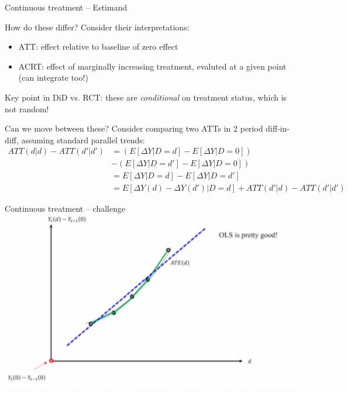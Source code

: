 \documentclass[notes,11pt, aspectratio=169]{beamer}
\newenvironment{wideitemize}{\itemize\addtolength{\itemsep}{10pt}}{\enditemize}
\begin{document}
\begin{frame}{Continuous treatment -- Estimand}
  \begin{wideitemize}
  \item How do these differ? Consider their interpretations:
    \begin{itemize}
    \item ATT: effect relative to baseline of zero effect
    \item ACRT: effect of marginally increasing treatment, evaluted at a given point (can integrate too!)
    \end{itemize}
  \item Key point in DiD vs. RCT: these are \emph{conditional} on treatment status, which is not random!
  \item Can we move between these? Consider comparing two ATTs in 2
    period diff-in-diff, assuming standard parallel trends:
    \begin{align*}
      ATT(d | d) -  ATT(d' | d') &= \left(E[\Delta Y | D = d]  - E[\Delta Y | D=0]\right)\\
                                 &- \left(E[\Delta Y | D = d']  - E[\Delta Y | D=0]\right)\\
                                 &= E[\Delta Y | D = d]  - E[\Delta Y | D = d']\\
                                 &= E[\Delta Y(d) - \Delta Y(d') | D = d]  + ATT(d' | d) - ATT(d' | d')
    \end{align*}
  \end{wideitemize}
\end{frame}

\begin{frame}{Continuous treatment -- challenge}
  \includegraphics[width=0.8\linewidth]{images/continuous_did_1.pdf}
\end{frame}
\end{document}
